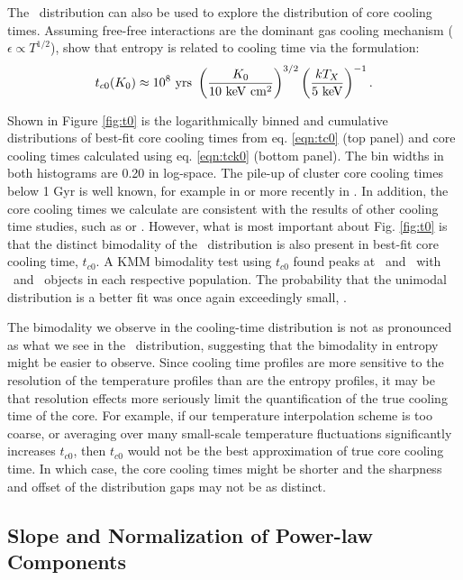 \documentclass[12pt,preprint]{aastex}
\begin{document}
The \kna\ distribution can also be used to explore the distribution of
core cooling times. Assuming free-free interactions are the dominant
gas cooling mechanism (\ie\ $\epsilon \propto T^{1/2}$),
\citet{radioquiet} show that entropy is related to cooling time via
the formulation:
\begin{equation}
t_{c0}(\kna) \approx 10^8 \yrs\ \left(\frac{\kna}{10 \keV \cmsq}\right)^{3/2} \left(\frac{kT_X}{5 \keV}\right)^{-1}.
\label{eqn:tck0}
\end{equation}

Shown in Figure \ref{fig:t0} is the logarithmically binned and
cumulative distributions of best-fit core cooling times from
eq. \ref{eqn:tc0} (top panel) and core cooling times calculated using
eq. \ref{eqn:tck0} (bottom panel). The bin widths in both histograms
are 0.20 in log-space. The pile-up of cluster core cooling times below
1 Gyr is well known, for example in \citet{hu85} or more recently in
\citet{dunn08}. In addition, the core cooling times we calculate are
consistent with the results of other cooling time studies, such as
\citet{1998MNRAS.298..416P} or \citet{2008arXiv0802.1864R}. However,
what is most important about Fig. \ref{fig:t0} is that the distinct
bimodality of the \kna\ distribution is also present in best-fit core
cooling time, $t_{c0}$. A KMM bimodality test using $t_{c0}$ found
peaks at \tckmma\ and \tckmmb\ with \tckmmc\ and \tckmmd\ objects in
each respective population. The probability that the unimodal
distribution is a better fit was once again exceedingly small,
\tckmme.

The bimodality we observe in the cooling-time distribution is not as
pronounced as what we see in the \kna\ distribution, suggesting that
the bimodality in entropy might be easier to observe. Since cooling
time profiles are more sensitive to the resolution of the temperature
profiles than are the entropy profiles, it may be that resolution
effects more seriously limit the quantification of the true cooling
time of the core. For example, if our temperature interpolation scheme
is too coarse, or averaging over many small-scale temperature
fluctuations significantly increases $t_{c0}$, then $t_{c0}$ would not
be the best approximation of true core cooling time. In which case,
the core cooling times might be shorter and the sharpness and offset
of the distribution gaps may not be as distinct.

\subsection{Slope and Normalization of Power-law Components}
\label{sec:slopes}
\end{document}
